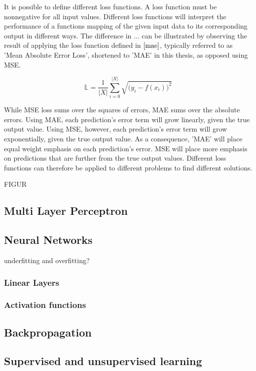 It is possible to define different loss functions. A loss function must be nonnegative for all input values.
Different loss functions will interpret the performance of a functions mapping of the given input data to its corresponding output in different ways.
The difference in ... can be illustrated by observing the result of applying the loss function defined in $ \eqref{mae} $, typically referred to as 'Mean Absolute Error Loss', shortened to 'MAE' in this thesis, as opposed using MSE.

\[ 
    \mathbb{L} = \frac{1}{|X|}\sum_{i = 0}^{|X|} \sqrt{\big(y_i - f(x_i)\big)^2} \tag{2.2} \label{mae} 
\]

While MSE loss sums over the squares of errors, MAE sums over the absolute errors.
Using MAE, each prediction's error term will grow linearly, given the true output value.
Using MSE, however, each prediction's error term will grow exponentially, given the true output value.
As a consequence, 'MAE' will place equal weight emphasis on each prediction's error.
MSE will place more emphasis on predictions that are further from the true output values.
Different loss functions can therefore be applied to different problems to find different solutions.


FIGUR







\subsection{Multi Layer Perceptron}
\subsection{Neural Networks}
underfitting and overfitting?
\subsubsection{Linear Layers}
\subsubsection{Activation functions}
\subsection{Backpropagation}
\subsection{Supervised and unsupervised learning}














